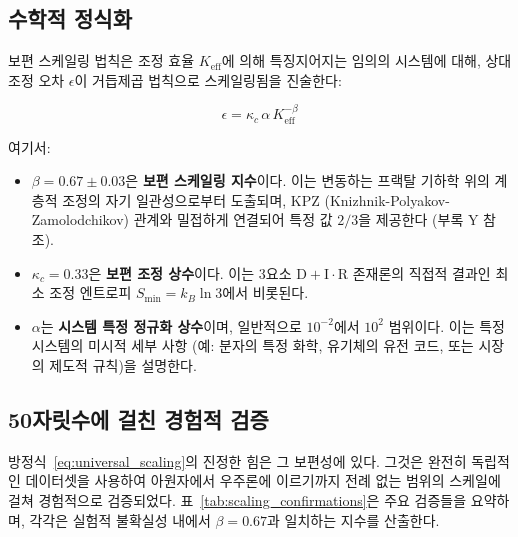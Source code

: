 \documentclass[11pt,a4paper]{article}
\begin{document}
\subsection{수학적 정식화}

보편 스케일링 법칙은 조정 효율 $K_{\mathrm{eff}}$에 의해 특징지어지는 임의의 시스템에 대해, 상대 조정 오차 $\epsilon$이 거듭제곱 법칙으로 스케일링됨을 진술한다:

\begin{equation}
	\boxed{\epsilon = \kappa_c \, \alpha \, K_{\mathrm{eff}}^{-\beta}}
	\label{eq:universal_scaling}
\end{equation}

여기서:
\begin{itemize}
	\item $\beta = 0.67 \pm 0.03$은 \textbf{보편 스케일링 지수}이다. 이는 변동하는 프랙탈 기하학 위의 계층적 조정의 자기 일관성으로부터 도출되며, KPZ (Knizhnik-Polyakov-Zamolodchikov) 관계와 밀접하게 연결되어 특정 값 $2/3$을 제공한다 (부록 Y 참조).
	\item $\kappa_c = 0.33$은 \textbf{보편 조정 상수}이다. 이는 3요소 $\mathrm{D}+\mathrm{I}\cdot\mathrm{R}$ 존재론의 직접적 결과인 최소 조정 엔트로피 $S_{\mathrm{min}} = k_B \ln 3$에서 비롯된다.
	\item $\alpha$는 \textbf{시스템 특정 정규화 상수}이며, 일반적으로 $10^{-2}$에서 $10^2$ 범위이다. 이는 특정 시스템의 미시적 세부 사항 (예: 분자의 특정 화학, 유기체의 유전 코드, 또는 시장의 제도적 규칙)을 설명한다.
\end{itemize}

\subsection{50자릿수에 걸친 경험적 검증}

방정식~\eqref{eq:universal_scaling}의 진정한 힘은 그 보편성에 있다. 그것은 완전히 독립적인 데이터셋을 사용하여 아원자에서 우주론에 이르기까지 전례 없는 범위의 스케일에 걸쳐 경험적으로 검증되었다. 표~\ref{tab:scaling_confirmations}은 주요 검증들을 요약하며, 각각은 실험적 불확실성 내에서 $\beta = 0.67$과 일치하는 지수를 산출한다.
\end{document}
